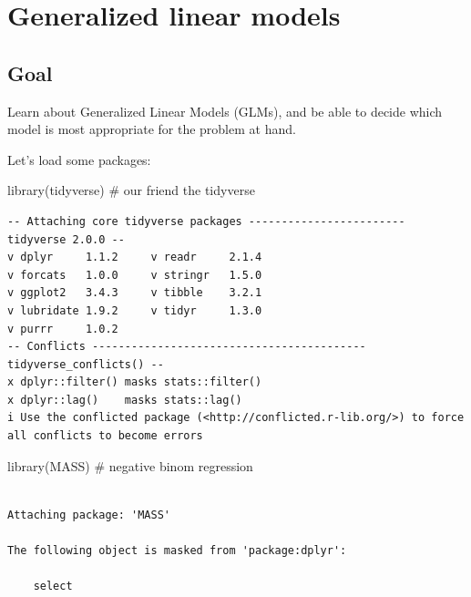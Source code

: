 \documentclass[
  letterpaper,
  DIV=11,
  numbers=noendperiod]{scrreprt}
\newenvironment{Shaded}{\begin{snugshade}}{\end{snugshade}}
\newcommand{\CommentTok}[1]{\textcolor[rgb]{0.37,0.37,0.37}{#1}}
\newcommand{\FunctionTok}[1]{\textcolor[rgb]{0.28,0.35,0.67}{#1}}
\newcommand{\NormalTok}[1]{\textcolor[rgb]{0.00,0.23,0.31}{#1}}
\begin{document}

\hypertarget{generalized-linear-models}{%
\chapter{Generalized linear models}\label{generalized-linear-models}}

\hypertarget{goal-4}{%
\section{Goal}\label{goal-4}}

Learn about Generalized Linear Models (GLMs), and be able to decide
which model is most appropriate for the problem at hand.

Let's load some packages:

\begin{Shaded}
\begin{Highlighting}[]
\FunctionTok{library}\NormalTok{(tidyverse) }\CommentTok{\# our friend the tidyverse}
\end{Highlighting}
\end{Shaded}

\begin{verbatim}
-- Attaching core tidyverse packages ------------------------ tidyverse 2.0.0 --
v dplyr     1.1.2     v readr     2.1.4
v forcats   1.0.0     v stringr   1.5.0
v ggplot2   3.4.3     v tibble    3.2.1
v lubridate 1.9.2     v tidyr     1.3.0
v purrr     1.0.2     
-- Conflicts ------------------------------------------ tidyverse_conflicts() --
x dplyr::filter() masks stats::filter()
x dplyr::lag()    masks stats::lag()
i Use the conflicted package (<http://conflicted.r-lib.org/>) to force all conflicts to become errors
\end{verbatim}

\begin{Shaded}
\begin{Highlighting}[]
\FunctionTok{library}\NormalTok{(MASS) }\CommentTok{\# negative binom regression}
\end{Highlighting}
\end{Shaded}

\begin{verbatim}

Attaching package: 'MASS'

The following object is masked from 'package:dplyr':

    select
\end{verbatim}
\end{document}
